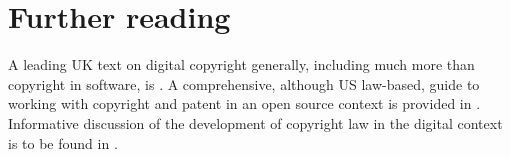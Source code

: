 \documentclass[a4paper,12pt]{article}
\begin{document}
\section{Further reading}

A leading UK text on digital copyright generally, including much more than
copyright in software, is \citet{Stokes2009}. A comprehensive, although US law-based, guide to
working with copyright and patent in an open source context is provided in
\citet{Lindberg2008}. Informative discussion of the
development of copyright law in the digital context is to be found in \citet{Lessig2006}.


\end{document}
